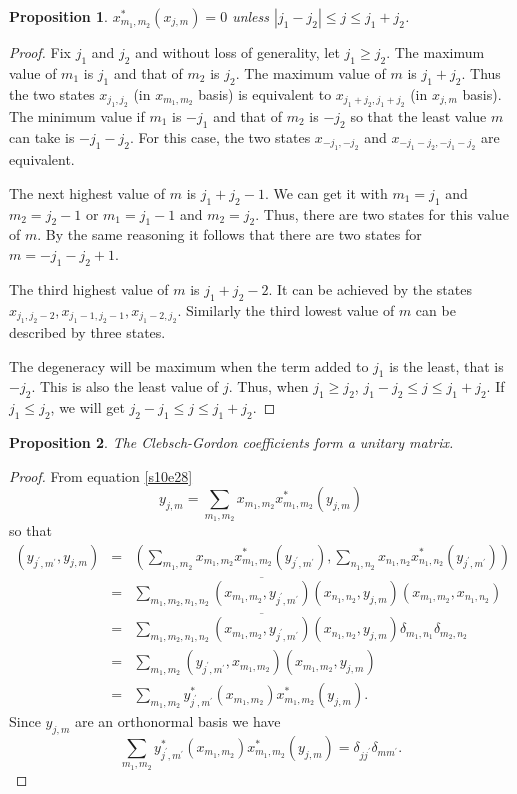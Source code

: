 \documentclass{article}
\numberwithin{equation}{section}
\theoremstyle{plain}
\numberwithin{thm}{section}
\theoremstyle{plain}
\newtheorem{prop}{Proposition}
\numberwithin{prop}{section}
\theoremstyle{definition}
\numberwithin{defn}{section}
\theoremstyle{remark}
\begin{document}
\begin{prop}\label{s10p6}
$x_{m_1,m_2}^\ast(x_{j,m}) = 0$ unless $|j_1 - j_2| \le j \le j_1 + j_2$.
\end{prop}
\begin{proof}
Fix $j_1$ and $j_2$ and without loss of generality, let $j_1 \ge j_2$. The
maximum value of $m_1$ is $j_1$ and that of $m_2$ is $j_2$. The maximum value
of $m$ is $j_1 + j_2$. Thus the two states $x_{j_1, j_2}$ (in $x_{m_1,m_2}$
basis) is equivalent to $x_{j_1+j_2, j_1+j_2}$ (in $x_{j,m}$ basis). The minimum
value if $m_1$ is $-j_1$ and that of $m_2$ is $-j_2$ so that the least value
$m$ can take is $-j_1-j_2$. For this case, the two states $x_{-j_1,-j_2}$
and $x_{-j_1-j_2,-j_1-j_2}$ are equivalent.

The next highest value of $m$ is $j_1+j_2-1$. We can get it with $m_1 = j_1$ 
and $m_2 = j_2 - 1$ or $m_1 = j_1 - 1$ and $m_2 = j_2$. Thus, there are two 
states for this value of $m$. By the same reasoning it follows that there are
two states for $m = -j_1 - j_2 + 1$.

The third highest value of $m$ is $j_1 + j_2 - 2$. It can be achieved by
the states $x_{j_1, j_2 - 2}, x_{j_1 - 1, j_2 - 1}, x_{j_1 - 2, j_2}$. Similarly
the third lowest value of $m$ can be described by three states.

The degeneracy will be maximum when the term added to $j_1$ is the least, that
is $-j_2$. This is also the least value of $j$. Thus, when $j_1 \ge j_2$, $
j_1 - j_2 \le j \le j_1 + j_2$. If $j_1 \le j_2$, we will get $j_2 - j_1 \le
j \le j_1 + j_2$.
\end{proof}

\begin{prop}\label{s10p7}
The Clebsch-Gordon coefficients form a unitary matrix.
\end{prop}
\begin{proof}
From equation \eqref{s10e28}
\[
y_{j,m} = \sum_{m_1,m_2} x_{m_1,m_2}x^\ast_{m_1,m_2}(y_{j,m})
\]
so that
\begin{eqnarray*}
(y_{j^\prime,m^\prime}, y_{j,m}) &=& 
 \left(\sum_{m_1,m_2}x_{m_1,m_2}x_{m_1,m_2}^\ast(y_{j^\prime,m^\prime}),
 \sum_{n_1,n_2}x_{n_1,n_2}x_{n_1,n_2}^\ast(y_{j^\prime,m^\prime})\right) \\
 &=& \sum_{m_1,m_2,n_1,n_2}\overline{(x_{m_1,m_2}, y_{j^\prime,m^\prime})}
 (x_{n_1,n_2}, y_{j,m}) (x_{m_1,m_2}, x_{n_1,n_2}) \\
 &=& \sum_{m_1,m_2,n_1,n_2}\overline{(x_{m_1,m_2}, y_{j^\prime,m^\prime})}
 (x_{n_1,n_2}, y_{j,m}) \delta_{m_1,n_1}\delta_{m_2,n_2} \\
 &=& \sum_{m_1,m_2}(y_{j^\prime,m^\prime}, x_{m_1,m_2})(x_{m_1,m_2}, y_{j,m}) \\
 &=& \sum_{m_1,m_2} y_{j^\prime,m^\prime}^\ast(x_{m_1,m_2}) x^\ast_{m_1,m_2}
 (y_{j,m}).
\end{eqnarray*}
Since $y_{j,m}$ are an orthonormal basis we have
\[
\sum_{m_1,m_2} y_{j^\prime,m^\prime}^\ast(x_{m_1,m_2}) x^\ast_{m_1,m_2}(y_{j,m})
= \delta_{jj^\prime}\delta_{mm^\prime}.
\]
\end{proof}
\end{document}
